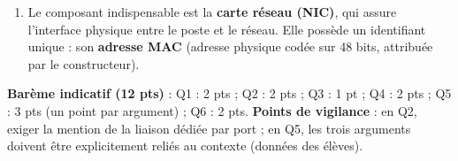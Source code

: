 \documentclass[11pt]{article}
\newcommand{\cle}[1]{{\popxbold\color{popdark}#1}}
\begin{document}
\begin{corrige}
\begin{enumerate}
  \begin{itemize}
    \item \textbf{Sécurité} : les données sensibles (notes, examens) circulent dans des câbles et non par ondes radio interceptables depuis l'extérieur de la salle ;
    \item \textbf{Stabilité du débit} : chaque poste dispose de \SI{100}{Mbit/s} dédiés, garantis, alors qu'en Wi-Fi le débit réel chute avec le nombre de postes et les interférences ;
    \item \textbf{Fiabilité} : pas de collisions (commutation full-duplex) et pas de perturbations radio, ce qui convient à une salle d'examen où une coupure est inacceptable.
  \end{itemize}
  \item Le composant indispensable est la \textbf{\cle{carte réseau} (NIC)}, qui assure l'interface physique entre le poste et le réseau. Elle possède un identifiant unique : son \textbf{\cle{adresse MAC}} (adresse physique codée sur 48 bits, attribuée par le constructeur).
\end{enumerate}
\textbf{Barème indicatif (12 pts)} : Q1 : 2 pts ; Q2 : 2 pts ; Q3 : 1 pt ; Q4 : 2 pts ; Q5 : 3 pts (un point par argument) ; Q6 : 2 pts. \textbf{Points de vigilance} : en Q2, exiger la mention de la liaison dédiée par port ; en Q5, les trois arguments doivent être explicitement reliés au contexte (données des élèves).
\end{corrige}
\end{document}
